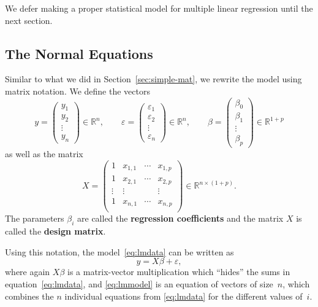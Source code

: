 \documentclass[
  a4paper,
]{article}
\theoremstyle{definition}
\theoremstyle{definition}
\theoremstyle{definition}
\theoremstyle{definition}
\theoremstyle{remark}
\begin{document}
We defer making a proper statistical model for multiple linear regression
until the next section.

\hypertarget{the-normal-equations}{%
\subsection{The Normal Equations}\label{the-normal-equations}}

Similar to what we did in Section~\ref{sec:simple-mat}, we rewrite
the model using matrix notation. We define the vectors
\begin{equation*}
  y = \begin{pmatrix}
    y_1 \\ y_2 \\ \vdots \\ y_n
  \end{pmatrix}
  \in \mathbb{R}^n,
  \qquad
  \varepsilon= \begin{pmatrix}
    \varepsilon_1 \\ \varepsilon_2 \\ \vdots \\ \varepsilon_n
  \end{pmatrix}
  \in \mathbb{R}^n,
  \qquad
  \beta = \begin{pmatrix}
    \beta_0 \\
    \beta_1 \\
    \vdots \\
    \beta_p
  \end{pmatrix}
  \in\mathbb{R}^{1+p}
\end{equation*}
as well as the matrix
\begin{equation*}
  X = \begin{pmatrix}
    1 & x_{1,1} & \cdots & x_{1,p} \\
    1 & x_{2,1} & \cdots & x_{2,p} \\
    \vdots & \vdots & & \vdots \\
    1 & x_{n,1} & \cdots & x_{n,p} \\
  \end{pmatrix}
  \in \mathbb{R}^{n\times (1+p)}.
\end{equation*}
The parameters \(\beta_i\) are called the \textbf{regression coefficients} and
the matrix \(X\) is called the \textbf{design matrix}.

Using this notation, the model~\eqref{eq:lmdata} can be written
as
\begin{equation}
  y = X \beta + \varepsilon,  \label{eq:lmmodel}
\end{equation}
where again \(X\beta\) is a matrix-vector multiplication which ``hides''
the sums in equation~\eqref{eq:lmdata}, and \eqref{eq:lmmodel}
is an equation of vectors of size~\(n\), which combines the \(n\)
individual equations from \eqref{eq:lmdata} for the different
values of~\(i\).
\end{document}
